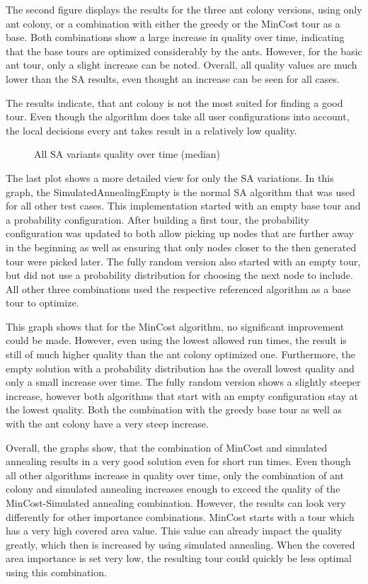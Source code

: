 The second figure displays the results for the three ant colony versions, using only ant colony, or a combination with either the greedy or the MinCost tour as a base.
Both combinations show a large increase in quality over time, indicating that the base tours are optimized considerably by the ants.
However, for the basic ant tour, only a slight increase can be noted.
Overall, all quality values are much lower than the SA results, even thought an increase can be seen for all cases.

The results indicate, that ant colony is not the most suited for finding a good tour.
Even though the algorithm does take all user configurations into account, the local decisions every ant takes result in a relatively low quality.



\begin{figure}[H]
	\centering
	
	\caption{All SA variants quality over time (median)}
	\label{fig:AllOverTimeSA}
\end{figure}


The last plot shows a more detailed view for only the SA variations. 
In this graph, the SimulatedAnnealingEmpty is the normal SA algorithm that was used for all other test cases.
This implementation started with an empty base tour and a probability configuration.
After building a first tour, the probability configuration was updated to both allow picking up nodes that are further away in the beginning as well as ensuring that only nodes closer to the then generated tour were picked later.
The fully random version also started with an empty tour, but did not use a probability distribution for choosing the next node to include.
All other three combinations used the respective referenced algorithm as a base tour to optimize.

This graph shows that for the MinCost algorithm, no significant improvement could be made. 
However, even using the lowest allowed run times, the result is still of much higher quality than the ant colony optimized one.
Furthermore, the empty solution with a probability distribution has the overall lowest quality and only a small increase over time.
The fully random version shows a slightly steeper increase, however both algorithms that start with an empty configuration stay at the lowest quality.
Both the combination with the greedy base tour as well as with the ant colony have a very steep increase. 

Overall, the graphs show, that the combination of MinCost and simulated annealing results in a very good solution even for short run times. 
Even though all other algorithms increase in quality over time, only the combination of ant colony and simulated annealing increases enough to exceed the quality of the MinCost-Simulated annealing combination.
However, the results can look very differently for other importance combinations.
MinCost starts with a tour which has a very high covered area value.
This value can already impact the quality greatly, which then is increased by using simulated annealing.
When the covered area importance is set very low, the resulting tour could quickly be less optimal using this combination.

